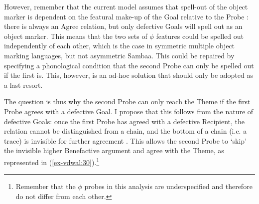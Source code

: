 \documentclass[output=paper
,modfonts
,nonflat]{langsci/langscibook}
\begin{document}
\begin{figure}[!h]
\begin{exe}
\end{exe} \vspace{-1.9cm}
\end{figure}
 \noindent
However, remember that the current model assumes that spell-out of the object marker is dependent on the featural make-up of the Goal relative to the Probe \citep{Roberts2010, Iorio2014, Van_der_Wal2015}: there is always an Agree relation, but only defective Goals will spell out as an object marker. This means that the two sets of $\phi$ features could be spelled out independently of each other, which is the case in symmetric multiple object marking languages, but not asymmetric Sambaa. This could be repaired by specifying a phonological condition that the second Probe can only be spelled out if the first is. This, however, is an ad-hoc solution that should only be adopted as a last resort. 

The question is thus why the second Probe can only reach the Theme if the first Probe agrees with a defective Goal. I propose that this follows from the nature of defective Goals: once the first Probe has agreed with a defective Recipient, the relation cannot be distinguished from a chain, and the bottom of a chain (i.e. a trace) is invisible for further agreement \citep{Chomsky2000, Chomsky2001}. This allows the second Probe to ‘skip’ the invisible higher Benefactive argument and agree with the Theme, as represented in (\ref{ex-vdwal:30}).\footnote{Remember that the $\phi$ probes in this analysis are underspecified and therefore do not differ from each other.} 
\end{document}
